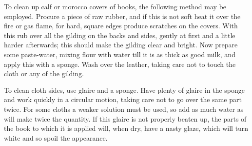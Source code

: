 \documentclass[twoside]{book}
\begin{document}
To clean up calf or morocco covers of books, the
following method may be employed. Procure a
piece of raw rubber, and if this is not soft heat it
over the fire or gas flame, for hard, square edges
produce scratches on the covers. With this rub
over all the gilding on the backs and sides, gently at
first and a little harder afterwards; this should make
the gilding clear and bright. Now prepare some
paste-water, mixing flour with water till it is as
thick as good milk, and apply this with a sponge.
Wash over the leather, taking care not to touch the
cloth or any of the gilding.

To clean cloth sides, use glaire and a sponge.
Have plenty of glaire in the sponge and work quickly
in a circular motion, taking care not to go over the
same part twice. For some cloths a weaker solution
must be used, so add as much water as will make
twice the quantity. If this glaire is not properly
beaten up, the parts of the book to which it is
applied will, when dry, have a nasty glaze, which will
turn white and so spoil the appearance.
\end{document}
